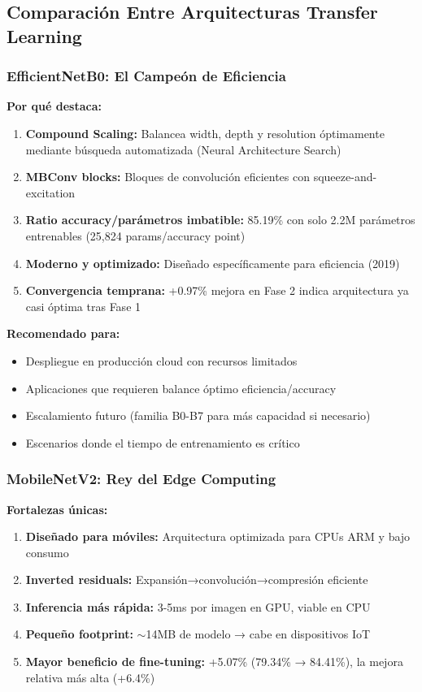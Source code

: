 \documentclass[11pt, a4paper]{article}
\begin{document}
\subsection{Comparación Entre Arquitecturas Transfer Learning}

\subsubsection{EfficientNetB0: El Campeón de Eficiencia}

\textbf{Por qué destaca:}

\begin{enumerate}
    \item \textbf{Compound Scaling:} Balancea width, depth y resolution óptimamente mediante búsqueda automatizada (Neural Architecture Search)
    \item \textbf{MBConv blocks:} Bloques de convolución eficientes con squeeze-and-excitation
    \item \textbf{Ratio accuracy/parámetros imbatible:} 85.19\% con solo 2.2M parámetros entrenables (25,824 params/accuracy point)
    \item \textbf{Moderno y optimizado:} Diseñado específicamente para eficiencia (2019)
    \item \textbf{Convergencia temprana:} +0.97\% mejora en Fase 2 indica arquitectura ya casi óptima tras Fase 1
\end{enumerate}

\textbf{Recomendado para:}
\begin{itemize}
    \item Despliegue en producción cloud con recursos limitados
    \item Aplicaciones que requieren balance óptimo eficiencia/accuracy
    \item Escalamiento futuro (familia B0-B7 para más capacidad si necesario)
    \item Escenarios donde el tiempo de entrenamiento es crítico
\end{itemize}

\subsubsection{MobileNetV2: Rey del Edge Computing}

\textbf{Fortalezas únicas:}

\begin{enumerate}
    \item \textbf{Diseñado para móviles:} Arquitectura optimizada para CPUs ARM y bajo consumo
    \item \textbf{Inverted residuals:} Expansión→convolución→compresión eficiente
    \item \textbf{Inferencia más rápida:} 3-5ms por imagen en GPU, viable en CPU
    \item \textbf{Pequeño footprint:} $\sim$14MB de modelo → cabe en dispositivos IoT
    \item \textbf{Mayor beneficio de fine-tuning:} +5.07\% (79.34\% → 84.41\%), la mejora relativa más alta (+6.4\%)
\end{enumerate}
\end{document}
